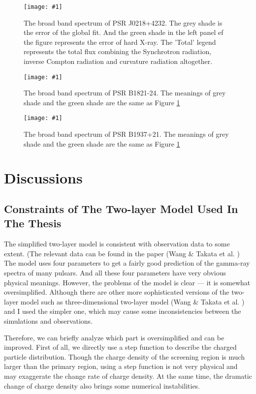 \documentclass[12pt]{report}
\newcommand{\singleFig}[3]{
  \begin{figure}[!htp]
    \centering
    \texttt{[image: \#1]}
    \caption{#3}
    \label{fig: #1}
  \end{figure}
}
\begin{document}
    \singleFig{j0218_twolayer_all.png}{0.37}{The broad band spectrum of PSR J0218+4232.
      The grey shade is the error of the global fit. And the green shade in the left panel ef the 
      figure represents the error of hard X-ray. The 'Total' legend represents the total flux 
      combining the Synchrotron radiation, inverse Compton radiation and curvature radiation
      altogether.}
    \vspace{0.5cm} 
    
    \singleFig{b1821_twolayer_all.png}{0.37}{The broad band spectrum of PSR B1821-24.
      The meanings of grey shade and the green shade are the same as Figure \ref{fig: j0218_twolayer_all.png}}
    \vspace{0.5cm} 
      
    \singleFig{j1939_twolayer_all_ave.png}{0.39}{The broad band spectrum of PSR B1937+21.
      The meanings of grey shade and the green shade are the same as Figure
      \ref{fig: j0218_twolayer_all.png}}
    \vspace{0.5cm}        


\chapter{Discussions}
  \section{Constraints of The Two-layer Model Used In The Thesis} 
    The simplified two-layer model is consistent with observation data to some extent. 
    (The relevant data can be found in the paper (Wang \& Takata et al. \cite{0004-637X-720-1-178})
    The model uses four parameters to get a fairly good prediction of the gamma-ray 
    spectra of many pulsars. And all these four parameters have very obvious physical 
    meanings. However, the problems of the model is clear --- it is somewhat 
    oversimplified. Although there are other more sophisticated versions of the 
    two-layer model such as three-dimensional two-layer model 
    (Wang \& Takata et al. \cite{doi:10.1111/j.1365-2966.2011.18577.x}) and I used the simpler 
    one, which may cause some inconsistencies between the simulations and observations. 

    Therefore, we can briefly analyze which part is oversimplified and can be improved. 
    First of all, we directly use a step function to describe the charged particle 
    distribution. Though the charge density of the screening region is much larger than 
    the primary region, using a step function is not very physical and may exaggerate 
    the change rate of charge density. At the same time, the dramatic change of charge 
    density also brings some numerical instabilities.
\end{document}
